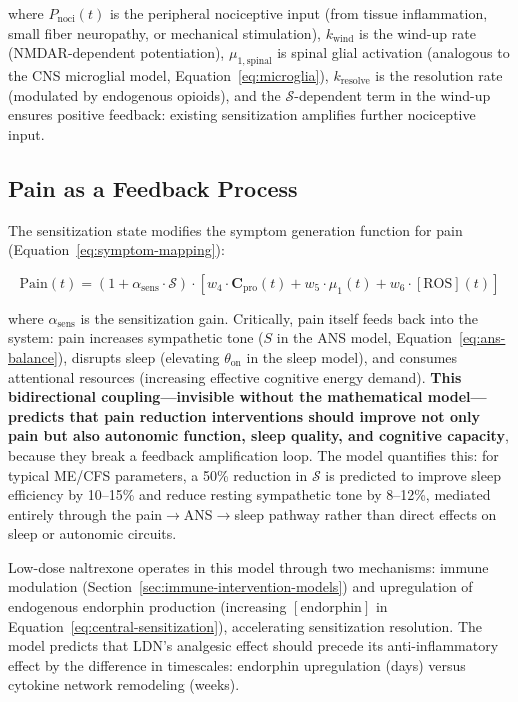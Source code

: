 where $P_{\text{noci}}(t)$ is the peripheral nociceptive input (from tissue inflammation, small fiber neuropathy, or mechanical stimulation), $k_{\text{wind}}$ is the wind-up rate (NMDAR-dependent potentiation), $\mu_{1,\text{spinal}}$ is spinal glial activation (analogous to the CNS microglial model, Equation~\ref{eq:microglia}), $k_{\text{resolve}}$ is the resolution rate (modulated by endogenous opioids), and the $\mathcal{S}$-dependent term in the wind-up ensures positive feedback: existing sensitization amplifies further nociceptive input.

\subsection{Pain as a Feedback Process}

The sensitization state modifies the symptom generation function for pain (Equation~\ref{eq:symptom-mapping}):

\begin{equation}
\label{eq:pain-sensitized}
\text{Pain}(t) = (1 + \alpha_{\text{sens}} \cdot \mathcal{S}) \cdot \left[ w_4 \cdot \boldsymbol{C}_{\text{pro}}(t) + w_5 \cdot \mu_1(t) + w_6 \cdot [\text{ROS}](t) \right]
\end{equation}

where $\alpha_{\text{sens}}$ is the sensitization gain. Critically, pain itself feeds back into the system: pain increases sympathetic tone ($S$ in the ANS model, Equation~\ref{eq:ans-balance}), disrupts sleep (elevating $\theta_{\text{on}}$ in the sleep model), and consumes attentional resources (increasing effective cognitive energy demand). \textbf{This bidirectional coupling---invisible without the mathematical model---predicts that pain reduction interventions should improve not only pain but also autonomic function, sleep quality, and cognitive capacity}, because they break a feedback amplification loop. The model quantifies this: for typical ME/CFS parameters, a 50\% reduction in $\mathcal{S}$ is predicted to improve sleep efficiency by 10--15\% and reduce resting sympathetic tone by 8--12\%, mediated entirely through the pain$\to$ANS$\to$sleep pathway rather than direct effects on sleep or autonomic circuits.

Low-dose naltrexone operates in this model through two mechanisms: immune modulation (Section~\ref{sec:immune-intervention-models}) and upregulation of endogenous endorphin production (increasing $[\text{endorphin}]$ in Equation~\ref{eq:central-sensitization}), accelerating sensitization resolution. The model predicts that LDN's analgesic effect should precede its anti-inflammatory effect by the difference in timescales: endorphin upregulation (days) versus cytokine network remodeling (weeks).


